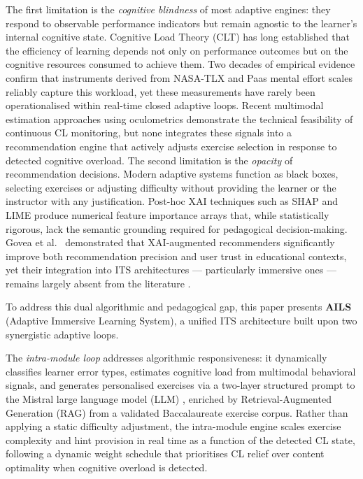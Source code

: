 \documentclass[ASNA,twocolumn]{USG} %
\begin{document}
The first limitation is the \emph{cognitive blindness} of
most adaptive engines: they respond to observable performance
indicators but remain agnostic to the learner's internal
cognitive state.
Cognitive Load Theory (CLT) \cite{Sweller1988} has long
established that the efficiency of learning depends not only
on performance outcomes but on the cognitive resources consumed
to achieve them.
Two decades of empirical evidence confirm that instruments
derived from NASA-TLX \cite{Hart1988} and Paas mental effort
scales \cite{Paas1992} reliably capture this workload, yet
these measurements have rarely been operationalised within
real-time closed adaptive loops.
Recent multimodal estimation approaches using oculometrics
\cite{Suzuki2024,Xue2024} demonstrate the technical
feasibility of continuous CL monitoring, but none integrates
these signals into a recommendation engine that actively adjusts
exercise selection in response to detected cognitive overload.
The second limitation is the \emph{opacity} of recommendation
decisions.
Modern adaptive systems function as black boxes, selecting
exercises or adjusting difficulty without providing the learner
or the instructor with any justification.
Post-hoc XAI techniques such as SHAP \cite{Lundberg2017} and
LIME \cite{Ribeiro2016} produce numerical feature importance
arrays that, while statistically rigorous, lack the semantic
grounding required for pedagogical decision-making.
Govea et al.\ \cite{Govea2024} demonstrated that
XAI-augmented recommenders significantly improve both
recommendation precision and user trust in educational
contexts, yet their integration into ITS architectures ---
particularly immersive ones --- remains largely absent from
the literature \cite{Khosravi2022}.

To address this dual algorithmic and pedagogical gap, this
paper presents \textbf{AILS} (Adaptive Immersive Learning
System), a unified ITS architecture built upon two
synergistic adaptive loops.

The \emph{intra-module loop} addresses algorithmic
responsiveness: it dynamically classifies learner error types,
estimates cognitive load from multimodal behavioral signals,
and generates personalised exercises via a two-layer
structured prompt to the Mistral large language model (LLM)
\cite{Said2024}, enriched by Retrieval-Augmented Generation
(RAG) from a validated Baccalaureate exercise corpus.
Rather than applying a static difficulty adjustment, the
intra-module engine scales exercise complexity and hint
provision in real time as a function of the detected CL state,
following a dynamic weight schedule that prioritises CL relief
over content optimality when cognitive overload is detected.
\end{document}

